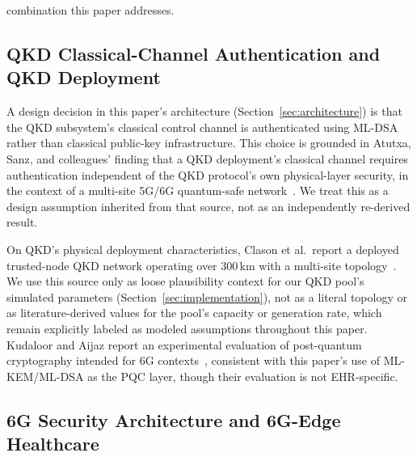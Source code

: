 \documentclass[journal]{IEEEtran}
\begin{document}
combination this paper addresses.

\subsection{QKD Classical-Channel Authentication and QKD Deployment}

A design decision in this paper's architecture (Section~\ref{sec:architecture}) is that the QKD subsystem's classical control channel is authenticated using ML-DSA rather than classical public-key infrastructure. This choice is grounded in Atutxa, Sanz, and colleagues' finding that a QKD deployment's classical channel requires authentication independent of the QKD protocol's own physical-layer security, in the context of a multi-site 5G/6G quantum-safe network~\cite{atutxasanz2025authentication}. We treat this as a design assumption inherited from that source, not as an independently re-derived result.

On QKD's physical deployment characteristics, Clason et al.\ report a deployed trusted-node QKD network operating over 300\,km with a multi-site topology~\cite{clason2026deployed}. We use this source only as loose plausibility context for our QKD pool's simulated parameters (Section~\ref{sec:implementation}), not as a literal topology or as literature-derived values for the pool's capacity or generation rate, which remain explicitly labeled as modeled assumptions throughout this paper. Kudaloor and Aijaz report an experimental evaluation of post-quantum cryptography intended for 6G contexts~\cite{kudaloor2026towardquantumsafe}, consistent with this paper's use of ML-KEM/ML-DSA as the PQC layer, though their evaluation is not EHR-specific.

\subsection{6G Security Architecture and 6G-Edge Healthcare}
\end{document}
